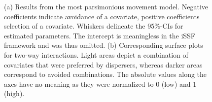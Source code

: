 \documentclass[abstract=on,10pt,a4paper,bibliography=totocnumbered]{scrartcl}
\begin{document}
\begin{figure}[hbtp]
  \begin{center}
    \caption{(a) Results from the most parsimonious movement model. Negative
    coefficients indicate avoidance of a covariate, positive coefficients
    selection of a covariate. Whiskers delineate the 95\%-CIs for estimated
    parameters. The intercept is meaningless in the iSSF framework and was thus
    omitted. (b) Corresponding surface plots for two-way interactions. Light
    areas depict a combination of covariates that were preferred by dispersers,
    whereas darker areas correspond to avoided combinations. The absolute values
    along the axes have no meaning as they were normalized to 0 (low) and 1
    (high).}
    \label{MovementModel}
  \end{center}
\end{figure}
\end{document}
